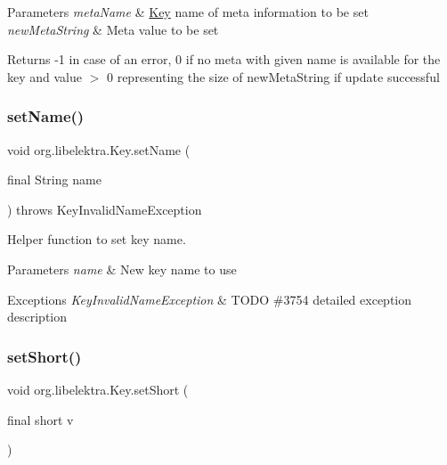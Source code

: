 \begin{DoxyParams}{Parameters}
{\em meta\+Name} & \hyperlink{classorg_1_1libelektra_1_1Key}{Key} name of meta information to be set \\
\hline
{\em new\+Meta\+String} & Meta value to be set \\
\hline
\end{DoxyParams}
\begin{DoxyReturn}{Returns}
-\/1 in case of an error, 0 if no meta with given name is available for the key and value $>$ 0 representing the size of new\+Meta\+String if update successful 
\end{DoxyReturn}
\mbox{\label{classorg_1_1libelektra_1_1Key_abd5602765701a10b6a10887c09810cf5}} 
\subsubsection{\texorpdfstring{set\+Name()}{setName()}}
{\footnotesize\ttfamily void org.\+libelektra.\+Key.\+set\+Name (\begin{DoxyParamCaption}\item[{final String}]{name }\end{DoxyParamCaption}) throws Key\+Invalid\+Name\+Exception\hspace{0.3cm}{\ttfamily [inline]}}



Helper function to set key name. 


\begin{DoxyParams}{Parameters}
{\em name} & New key name to use \\
\hline
\end{DoxyParams}

\begin{DoxyExceptions}{Exceptions}
{\em Key\+Invalid\+Name\+Exception} & T\+O\+DO \#3754 detailed exception description \\
\hline
\end{DoxyExceptions}
\mbox{\label{classorg_1_1libelektra_1_1Key_ac1621a8d43992b40b6b20a0e45182376}} 
\subsubsection{\texorpdfstring{set\+Short()}{setShort()}}
{\footnotesize\ttfamily void org.\+libelektra.\+Key.\+set\+Short (\begin{DoxyParamCaption}\item[{final short}]{v }\end{DoxyParamCaption})\hspace{0.3cm}{\ttfamily [inline]}}



